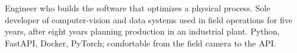 Engineer who builds the software that optimizes a physical process. Sole developer of computer-vision and
data systems used in field operations for five years, after eight years planning production in an
industrial plant. Python, FastAPI, Docker, PyTorch; comfortable from the field camera to the API.

